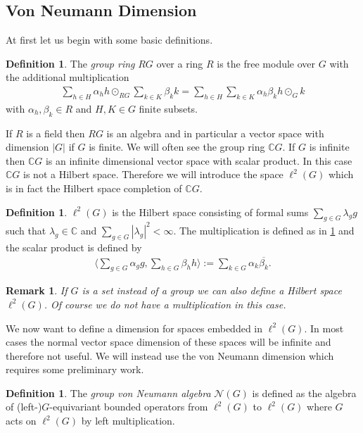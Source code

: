 \documentclass[12pt,a4paper]{scrartcl}
\theoremstyle{plain}
\newtheorem{Remark}[Theorem]{Remark}
\theoremstyle{definition}
\newtheorem{Definition}[Theorem]{Definition}
\newcommand{\C}{\mathbb{C}} %
\newcommand{\2}{\mathbb{Z} / 2 \mathbb{Z}}
\newcommand{\1}{\bar{1}}
\newcommand{\0}{\bar{0}}
\begin{document}
\subsection{Von Neumann Dimension} \label{fiss}
At first let us begin with some basic definitions.
\begin{Definition} \label{GR}
	The \emph{group ring} $RG$ over a ring $R$ is the free module over $G$ with the additional multiplication
	\begin{align*}
		\sum_{h \in H} \alpha_h h \odot_{RG} \sum_{k \in K} \beta_k k = \sum_{h \in H} \sum_{k \in K} \alpha_h \beta_k h \odot_G k
	\end{align*}
	with $\alpha_h, \beta_k \in R$ and $H, K \in G$ finite subsets.
\end{Definition}
If $R$ is a field then $RG$ is an algebra and in particular a vector space with dimension $|G|$ if $G$ is finite. We will often see the group ring $\C G$. If $G$ is infinite then $\C G$ is an infinite dimensional vector space with scalar product. In this case $\C G$ is not a Hilbert space. Therefore we will introduce the space $\ell^2(G)$ which is in fact the Hilbert space completion of $\C G$.
\begin{Definition}
	$\ell^2(G)$ is the Hilbert space consisting of formal sums $\sum_{g \in G} \lambda_g g$ such that $\lambda_g \in \C$ and $\sum_{g \in G} |\lambda_g|^2 < \infty$. The multiplication is defined as in \ref{GR} and the scalar product is defined by
	\begin{align*}
		\langle \sum_{g \in G} \alpha_g g, \sum_{h \in G} \beta_h  h \rangle := \sum_{k \in G} \alpha_k \overline{\beta_k}.
	\end{align*}
\end{Definition}
\begin{Remark}
	If $G$ is a set instead of a group we can also define a Hilbert space $\ell^2(G)$. Of course we do not have a multiplication in this case.
\end{Remark}
We now want to define a dimension for spaces embedded in $\ell^2(G)$. In most cases the normal vector space dimension of these spaces will be infinite and therefore not useful. We will instead use the von Neumann dimension which requires some preliminary work.
\begin{Definition}
	The \emph{group von Neumann algebra} $\mathcal{N}(G)$ is defined as the algebra of (left-)$G$-equivariant bounded operators from $\ell^2(G)$ to $\ell^2(G)$ where $G$ acts on $\ell^2(G)$ by left multiplication.
\end{Definition}
\end{document}
